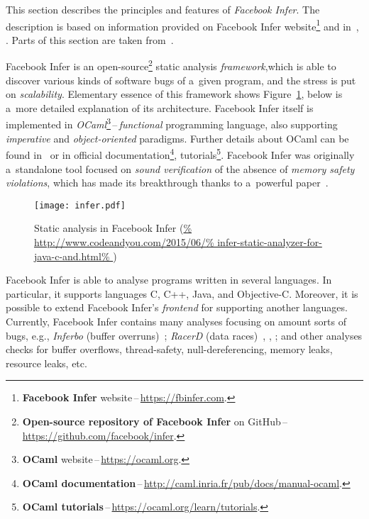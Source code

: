 This section describes the principles and features of
\emph{Facebook Infer}. The description is based on information provided
on Facebook Infer website\footnote{\textbf{Facebook Infer}
website\,--\,\url{https://fbinfer.com}.} and in~\cite{inferAISlides},
\cite{projectPracticeMarcin2018}. Parts of this section are taken
from~\cite{excel2019FBInfer}.

Facebook Infer is an open-source\footnote{\textbf{Open-source repository of
Facebook Infer} on GitHub\,--\,\url{https://github.com/facebook/infer}.}
static analysis \emph{framework},which is able to discover various kinds of
software bugs of a~given program, and the stress is put on \emph{scalability}.
Elementary essence of this framework shows Figure~\ref{fig:infer}, below
is a~more detailed explanation of its architecture. Facebook Infer
itself is implemented in \emph{OCaml}\footnote{\textbf{OCaml}
website\,--\,\url{https://ocaml.org}.}\,--\,\emph{functional} programming
language, also supporting \emph{imperative} and \emph{object-oriented}
paradigms. Further details about OCaml can be found in~\cite{realWorldOCaml}
or in official documentation\footnote{\textbf{OCaml
documentation}\,--\,\url{http://caml.inria.fr/pub/docs/manual-ocaml}.},
tutorials\footnote{\textbf{OCaml
tutorials}\,--\,\url{https://ocaml.org/learn/tutorials}.}. Facebook Infer was
originally a~standalone tool focused on \emph{sound verification} of
the absence of \emph{memory safety violations}, which has made its breakthrough
thanks to a~powerful paper~\cite{inferBiabduction}.

\begin{figure}[hbt]
    \centering
    \texttt{[image: infer.pdf]}
    \caption{%
        Static analysis in Facebook Infer
        (\url{%
            http://www.codeandyou.com/2015/06/%
            infer-static-analyzer-for-java-c-and.html%
        })
    }
    \label{fig:infer}
\end{figure}

Facebook Infer is able to analyse programs written in several languages.
In particular, it supports languages C, C++, Java, and Objective-C. Moreover,
it is possible to extend Facebook Infer's \emph{frontend} for supporting
another languages. Currently, Facebook Infer contains many analyses focusing
on amount sorts of bugs, e.g., \emph{Inferbo} (buffer
overruns)~\cite{inferboOnline}; \emph{RacerD} (data races)~\cite{racerD},
\cite{racerDOnline}, \cite{staticRaceDetectorTruePositive}; and other analyses
checks for buffer overflows, thread-safety, null-dereferencing, memory leaks,
resource leaks, etc.


